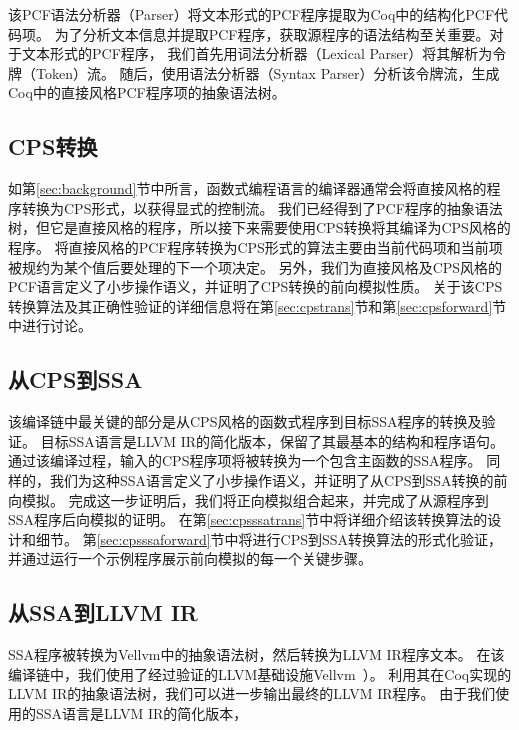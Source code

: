 该PCF语法分析器（Parser）将文本形式的PCF程序提取为Coq中的结构化PCF代码项。
为了分析文本信息并提取PCF程序，获取源程序的语法结构至关重要。对于文本形式的PCF程序，
我们首先用词法分析器（Lexical Parser）将其解析为令牌（Token）流。
随后，使用语法分析器（Syntax Parser）分析该令牌流，生成Coq中的直接风格PCF程序项的抽象语法树。

\subsection{CPS转换}

如第\ref{sec:background}节中所言，函数式编程语言的编译器通常会将直接风格的程序转换为CPS形式，以获得显式的控制流。
我们已经得到了PCF程序的抽象语法树，但它是直接风格的程序，所以接下来需要使用CPS转换将其编译为CPS风格的程序。
将直接风格的PCF程序转换为CPS形式的算法主要由当前代码项和当前项被规约为某个值后要处理的下一个项决定。
另外，我们为直接风格及CPS风格的PCF语言定义了小步操作语义，并证明了CPS转换的前向模拟性质。
关于该CPS转换算法及其正确性验证的详细信息将在第\ref{sec:cpstrans}节和第\ref{sec:cpsforward}节中进行讨论。

\subsection{从CPS到SSA}

该编译链中最关键的部分是从CPS风格的函数式程序到目标SSA程序的转换及验证。
目标SSA语言是LLVM IR的简化版本，保留了其最基本的结构和程序语句。
通过该编译过程，输入的CPS程序项将被转换为一个包含主函数的SSA程序。
同样的，我们为这种SSA语言定义了小步操作语义，并证明了从CPS到SSA转换的前向模拟。
完成这一步证明后，我们将正向模拟组合起来，并完成了从源程序到SSA程序后向模拟的证明。
在第\ref{sec:cpsssatrans}节中将详细介绍该转换算法的设计和细节。
第\ref{sec:cpsssaforward}节中将进行CPS到SSA转换算法的形式化验证，并通过运行一个示例程序展示前向模拟的每一个关键步骤。

\subsection{从SSA到LLVM IR}

SSA程序被转换为Vellvm中的抽象语法树，然后转换为LLVM IR程序文本。
在该编译链中，我们使用了经过验证的LLVM基础设施Vellvm~\cite{zakowski2021modular}）。
利用其在Coq实现的LLVM IR的抽象语法树，我们可以进一步输出最终的LLVM IR程序。
由于我们使用的SSA语言是LLVM IR的简化版本，
